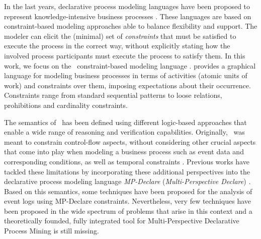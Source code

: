 In the last years, declarative process modeling languages have been proposed to represent knowledge-intensive business processes \cite{DBLP:journals/jodsn/CiccioM015}. These languages are based on constraint-based modeling approaches able to balance flexibility and support. The modeler can elicit the (minimal) set of \emph{constraints} that must be satisfied to execute the process in the correct way, without explicitly stating how the involved process participants must execute the process to satisfy them. 
In this work, we focus on the \condec\ constraint-based modeling language \cite{Pesic2007:DECLARE}. \condec provides a graphical language for modeling business processes in terms of activities (atomic units of work) and constraints over them, imposing expectations about their occurrence. Constraints range from standard sequential patterns to loose relations, prohibitions and cardinality constraints.



The semantics of \condec\ has been defined using different logic-based approaches that enable a wide range of reasoning and verification capabilities. Originally, \condec\ was meant to constrain control-flow aspects, without considering other crucial aspects that come into play when modeling a business process such as event data and corresponding conditions, as well as temporal constraints \cite{DBLP:journals/internet/0002SSA12,MMvdA,Ly11}. Previous works have tackled these limitations by incorporating these additional perspectives into the declarative process modeling language \emph{MP-Declare} (\emph{Multi-Perspective Declare}) \cite{DBLP:journals/eswa/BurattinMS16}. Based on this semantics, some techniques have been proposed for the analysis of event logs using MP-Declare constraints. Nevertheless, very few techniques have been proposed in the wide spectrum of problems that arise in this context and a theoretically founded, fully integrated tool for Multi-Perspective Declarative Process Mining is still missing.


